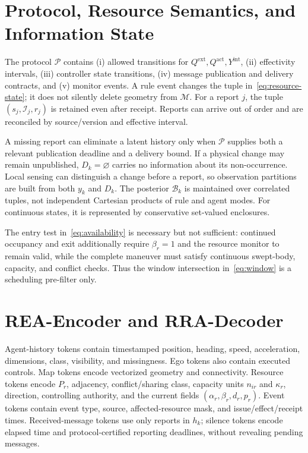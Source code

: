 \documentclass[letterpaper]{article} %
\newcommand{\Pset}{\ensuremath{\mathcal P}}
\newcommand{\Mset}{\ensuremath{\mathcal M}}
\newcommand{\Bset}{\ensuremath{\mathcal B}}
\newcommand{\Null}{\ensuremath{\varnothing}}
\begin{document}
\section{Protocol, Resource Semantics, and Information State}
\label{app:protocol}
The protocol $\Pset$ contains (i) allowed transitions for $Q^{\mathrm{ext}},Q^{\mathrm{act}},Y^{\mathrm{int}}$, (ii) effectivity intervals, (iii) controller state transitions, (iv) message publication and delivery contracts, and (v) monitor events. A rule event changes the tuple in~\eqref{eq:resource-state}; it does not silently delete geometry from $\Mset$. For a report $j$, the tuple $(s_j,\mathcal I_j,r_j)$ is retained even after receipt. Reports can arrive out of order and are reconciled by source/version and effective interval.

A missing report can eliminate a latent history only when $\Pset$ supplies both a relevant publication deadline and a delivery bound. If a physical change may remain unpublished, $D_k=\Null$ carries no information about its non-occurrence. Local sensing can distinguish a change before a report, so observation partitions are built from both $y_k$ and $D_k$. The posterior $\Bset_k$ is maintained over correlated tuples, not independent Cartesian products of rule and agent modes. For continuous states, it is represented by conservative set-valued enclosures.

The entry test in~\eqref{eq:availability} is necessary but not sufficient:
continued occupancy and exit additionally require $\beta_r=1$ and the
resource monitor to remain valid, while the complete maneuver must satisfy
continuous swept-body, capacity, and conflict checks. Thus the window
intersection in~\eqref{eq:window} is a scheduling pre-filter only.

\section{REA-Encoder and RRA-Decoder}
\label{app:forecast}
Agent-history tokens contain timestamped position, heading, speed,
acceleration, dimensions, class, visibility, and missingness. Ego tokens
also contain executed controls. Map tokens encode vectorized geometry and
connectivity. Resource tokens encode $P_r$, adjacency, conflict/sharing class,
capacity units $n_{ir}$ and $\kappa_r$, direction, controlling authority,
and the current fields $(\alpha_r,\beta_r,d_r,p_r)$. Event tokens contain
event type, source, affected-resource mask, and issue/effect/receipt times.
Received-message tokens use only reports in $h_k$; silence tokens encode
elapsed time and protocol-certified reporting deadlines, without revealing
pending messages.
\end{document}
